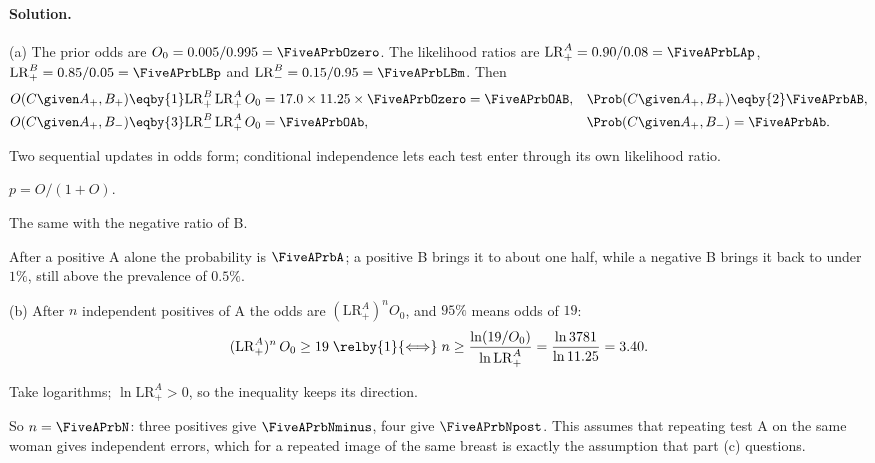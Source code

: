 \paragraph{Solution.}
(a) The prior odds are $O_0=0.005/0.995=\FiveAPrbOzero$. The likelihood ratios are
$\mathrm{LR}_+^A=0.90/0.08=\FiveAPrbLAp$, $\mathrm{LR}_+^B=0.85/0.05=\FiveAPrbLBp$ and
$\mathrm{LR}_-^B=0.15/0.95=\FiveAPrbLBm$. Then
\begin{align*}
  O(C\given A_+,B_+)
  &\eqby{1}\mathrm{LR}_+^B\,\mathrm{LR}_+^A\,O_0
   =17.0\times11.25\times\FiveAPrbOzero=\FiveAPrbOAB,
  &\Prob(C\given A_+,B_+)&\eqby{2}\FiveAPrbAB,\\
  O(C\given A_+,B_-)
  &\eqby{3}\mathrm{LR}_-^B\,\mathrm{LR}_+^A\,O_0
   =\FiveAPrbOAb,
  &\Prob(C\given A_+,B_-)&=\FiveAPrbAb .
\end{align*}
\begin{explain}
  \item Two sequential updates in odds form; conditional independence lets each test
        enter through its own likelihood ratio.
  \item $p=O/(1+O)$.
  \item The same with the negative ratio of B.
\end{explain}
After a positive A alone the probability is $\FiveAPrbA$; a positive B brings it to
about one half, while a negative B brings it back to under $1\%$, still above the
prevalence of $0.5\%$.

(b) After $n$ independent positives of A the odds are $(\mathrm{LR}_+^A)^nO_0$, and
$95\%$ means odds of $19$:
\begin{align*}
  (\mathrm{LR}_+^A)^n\,O_0\ge19
  \;\relby{1}{\Longleftrightarrow}\;
  n\ge\frac{\ln(19/O_0)}{\ln\mathrm{LR}_+^A}
  =\frac{\ln3781}{\ln11.25}=3.40 .
\end{align*}
\begin{explain}
  \item Take logarithms; $\ln\mathrm{LR}_+^A>0$, so the inequality keeps its direction.
\end{explain}
So $n=\FiveAPrbN$: three positives give $\FiveAPrbNminus$, four give $\FiveAPrbNpost$.
This assumes that repeating test A on the same woman gives independent errors, which
for a repeated image of the same breast is exactly the assumption that part (c)
questions.

